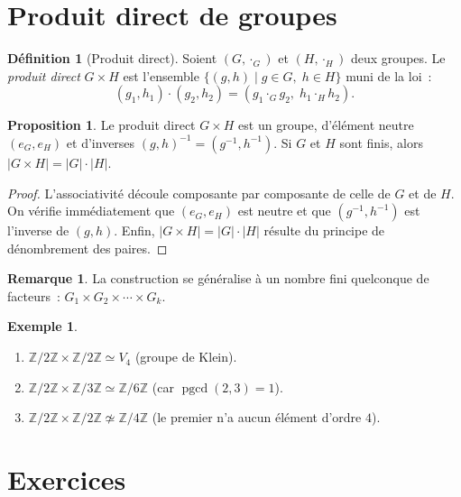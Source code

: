 \documentclass[12pt,a4paper,openany]{book}
\theoremstyle{definition}
\newtheorem{definition}{Définition}[chapter]
\newtheorem{proposition}{Proposition}[chapter]
\newtheorem{remarque}{Remarque}[chapter]
\newtheorem{exemple}{Exemple}[chapter]
\newcommand{\Z}{\mathbb{Z}}
\DeclareMathOperator{\pgcd}{pgcd}
\newcommand{\iso}{\simeq}
\newcommand{\abs}[1]{\lvert #1 \rvert}
\begin{document}
\section{Produit direct de groupes}
\label{sec:ch1-produit-direct}

\begin{definition}[Produit direct]
\label{def:produit-direct}
Soient $(G, \cdot_G)$ et $(H, \cdot_H)$ deux groupes. Le \emph{produit direct} $G
\times H$ est l'ensemble $\{(g, h) \mid g \in G, \; h \in H\}$ muni de la loi~:
\[
  (g_1, h_1) \cdot (g_2, h_2) = (g_1 \cdot_G g_2, \; h_1 \cdot_H h_2).
\]
\end{definition}

\begin{proposition}
\label{prop:produit-direct-groupe}
Le produit direct $G \times H$ est un groupe, d'élément neutre $(e_G, e_H)$ et
d'inverses $(g, h)^{-1} = (g^{-1}, h^{-1})$. Si $G$ et $H$ sont finis, alors $\abs{G
\times H} = \abs{G} \cdot \abs{H}$.
\end{proposition}

\begin{proof}
L'associativité découle composante par composante de celle de $G$ et de $H$. On vérifie
immédiatement que $(e_G, e_H)$ est neutre et que $(g^{-1}, h^{-1})$ est l'inverse de
$(g, h)$. Enfin, $\abs{G \times H} = \abs{G} \cdot \abs{H}$ résulte du principe de
dénombrement des paires.
\end{proof}

\begin{remarque}
La construction se généralise à un nombre fini quelconque de facteurs~: $G_1 \times G_2
\times \cdots \times G_k$.
\end{remarque}

\begin{exemple}
\label{ex:produit-direct-exemples}
\begin{enumerate}[label=(\roman*)]
  \item $\Z/2\Z \times \Z/2\Z \iso V_4$ (groupe de Klein).
  \item $\Z/2\Z \times \Z/3\Z \iso \Z/6\Z$ (car $\pgcd(2,3)=1$).
  \item $\Z/2\Z \times \Z/2\Z \not\iso \Z/4\Z$ (le premier n'a aucun élément d'ordre
    $4$).
\end{enumerate}
\end{exemple}

\section{Exercices}
\label{sec:ch1-exercices}
\end{document}
